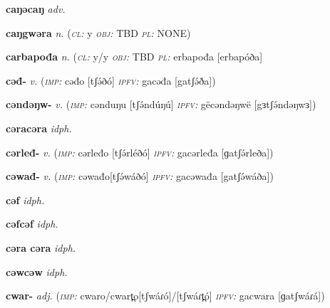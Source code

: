 \newentry
\headword\textbf{caŋəcaŋ} 
\synpos\textit{adv.} 

\newentry
\headword\textbf{caŋgwəra} 
\ipa{[tʃaŋgwə́ɾá]} 
\synpos\textit{n.} 
\class(\textit{\textsc{cl:}} {y}
\object\textit{\textsc{obj:}} TBD
\plural\textit{\textsc{pl:}} NONE) 

\newentry
\headword\textbf{carbapođa} 
\ipa{[ʧarbapóða]} 
\synpos\textit{n.} 
\class(\textit{\textsc{cl:}} {y/y}
\object\textit{\textsc{obj:}} TBD
\plural\textit{\textsc{pl:}} erbapođa [erbapóða] 

\newentry
\headword\textbf{cəđ-}
\ipa{[tʃə́ð-]}
\synpos\textit{v.} 
\imperative(\textit {\textsc{imp:}} cəđo [tʃə́ðó] 
\imperfective\textit{\textsc{ipfv:}} gacəđa [gatʃə́ð́a])

\newentry
\headword\textbf{cəndəŋw-}
\synpos\textit{v.} 
\imperative(\textit {\textsc{imp:}} cənduŋu [tʃə́ndúŋú] 
\imperfective\textit{\textsc{ipfv:}} gëcəndəŋwë [gɜtʃə́ndəŋwɜ])

\newentry
\headword\textbf{cəracəra}
\synpos\textit{idph.} 

\newentry
\headword\textbf{cərleđ-}
\synpos\textit{v.} 
\imperative(\textit {\textsc{imp:}} cərleđo [tʃə́rléðó] 
\imperfective\textit{\textsc{ipfv:}} gacərleđa [ɡatʃə́rleða])

\newentry
\headword\textbf{cəwađ-}
\ipa{[tʃə́wáð-]}
\synpos\textit{v.} 
\imperative(\textit {\textsc{imp:}} cəwađo[tʃə́wáðó] 
\imperfective\textit{\textsc{ipfv:}} gacəwađa [gatʃə́wáða])

\newentry
\headword\textbf{cəf}
\ipa{[tʃəf]}
\synpos\textit{idph.} 

\newentry
\headword\textbf{cəfcəf}
\synpos\textit{idph.} 

\newentry
\headword\textbf{cəra cəra}
\synpos\textit{idph.} 

\newentry
\headword\textbf{cəwcəw}
\synpos\textit{idph.} 

\newentry
\headword\textbf{cwar-}
\ipa{[tʃwáɾ-]}
\synpos\textit{adj.} 
\imperative(\textit {\textsc{imp:}} cwaro/cwart̪o[tʃwáɾó]/[tʃwáɾt̪ó] 
\imperfective\textit{\textsc{ipfv:}} gacwara [ɡatʃwáɾá])

